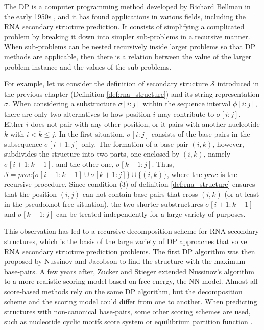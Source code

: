 The \ac{DP} is a computer programming method developed by Richard Bellman in the early 1950s \cite{bellman1957dynamic}, and it has found applications in various fields, including the \ac{RNA} secondary structure prediction. It consists of simplifying a complicated problem by breaking it down into simpler sub-problems in a recursive manner. When sub-problems can be nested recursively inside larger problems so that \ac{DP} methods are applicable, then there is a relation between the value of the larger problem instance and the values of the sub-problems. 

For example, let us consider the definition of secondary structure $\mathcal{S}$ introduced in the previous chapter (Definition \autoref{def:rna_structure}) and its string representation $\sigma$. When considering a substructure $\sigma[i:j]$ within the sequence interval $\phi[i:j]$, there are only two alternatives to how position $i$ may contribute to $\sigma[i:j]$. Either $i$ does not pair with any other position, or it pairs with another nucleotide $k$ with $i<k \leq j$. In the first situation, $\sigma[i : j]$ consists of the base-pairs in the subsequence $\sigma[i+1: j]$ only. The formation of a base-pair $(i, k)$, however, subdivides the structure into two parts, one enclosed by $(i, k)$, namely $\sigma[i + 1 : k - 1]$, and the other one, $\sigma[k + 1 : j]$. Thus, $\mathcal{S} = proc\{\sigma[i + 1 : k - 1] \cup  \sigma[k + 1 : j]\} \cup \{(i, k)\}$, where the $proc$ is the recursive procedure. Since condition (3) of definition \autoref{def:rna_structure} ensures that the position $(i,j)$ can not contain base-pairs that cross $(i, k)$ (or at least in the pseudoknot-free situation), the two shorter substructures $\sigma[i + 1 : k - 1]$ and $\sigma[k + 1: j]$ can be treated independently for a large variety of purposes.

This observation has led to a recursive decomposition scheme for \ac{RNA} secondary structures, which is the basis of the large variety of \ac{DP} approaches that solve \ac{RNA} secondary structure prediction problems. The first \ac{DP} algorithm was then proposed by Nussinov and Jacobson \cite{nussinov1980fast} to find the structure with the maximum base-pairs. A few years after, Zucker and Stieger \cite{zuker1981optimal} extended Nussinov's algorithm to a more realistic scoring model based on free energy, the \ac{NN} model. Almost all score-based methods rely on the same \ac{DP} algorithm, but the decomposition scheme and the scoring model could differ from one to another. When predicting structures with non-canonical base-pairs, some other scoring schemes are used, such as nucleotide cyclic motifs score system \cite{zu2011folding,parisien2008mc,dallaire2016exploring} or equilibrium partition function \cite{sloma2017base}. 

